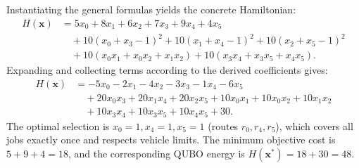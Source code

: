 \documentclass[12pt]{article}
\begin{document}
Instantiating the general formulas yields the concrete Hamiltonian:
\begin{align}
H(\mathbf{x}) &= 5x_0 + 8x_1 + 6x_2 + 7x_3 + 9x_4 + 4x_5 \\
&\quad + 10(x_0 + x_3 - 1)^2 + 10(x_1 + x_4 - 1)^2 + 10(x_2 + x_5 - 1)^2 \\
&\quad + 10(x_0x_1 + x_0x_2 + x_1x_2) + 10(x_3x_4 + x_3x_5 + x_4x_5).
\end{align}
Expanding and collecting terms according to the derived coefficients gives:
\begin{align}
H(\mathbf{x}) &= -5x_0 - 2x_1 - 4x_2 - 3x_3 - 1x_4 - 6x_5 \\
&\quad + 20x_0x_3 + 20x_1x_4 + 20x_2x_5 + 10x_0x_1 + 10x_0x_2 + 10x_1x_2 \\
&\quad + 10x_3x_4 + 10x_3x_5 + 10x_4x_5 + 30.
\end{align}
The optimal selection is $x_0=1, x_4=1, x_5=1$ (routes $r_0, r_4, r_5$), which covers all jobs exactly once and respects vehicle limits. The minimum objective cost is $5+9+4=18$, and the corresponding QUBO energy is $H(\mathbf{x}^*) = 18 + 30 = 48$.
\end{document}
